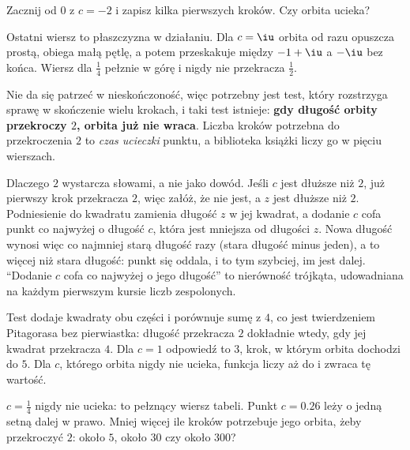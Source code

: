 \begin{think}
Zacznij od $0$ z $c = -2$ i zapisz kilka pierwszych kroków. Czy orbita
ucieka?
\end{think}



\noindent
Ostatni wiersz to płaszczyzna w działaniu. Dla $c = \iu$ orbita od razu
opuszcza prostą, obiega małą pętlę, a potem przeskakuje między $-1 + \iu$ a
$-\iu$ bez końca. Wiersz dla $\tfrac14$ pełznie w górę i nigdy nie
przekracza $\tfrac12$.

Nie da się patrzeć w nieskończoność, więc potrzebny jest test, który
rozstrzyga sprawę w skończenie wielu krokach, i taki test istnieje:
\textbf{gdy długość orbity przekroczy $2$, orbita już nie wraca}. Liczba
kroków potrzebna do przekroczenia $2$ to \emph{czas ucieczki} punktu, a
biblioteka książki liczy go w pięciu wierszach.

\begin{rigourbox}
Dlaczego $2$ wystarcza \dash{} słowami, a nie jako dowód. Jeśli $c$ jest
dłuższe niż $2$, już pierwszy krok przekracza $2$, więc załóż, że nie jest,
a $z$ jest dłuższe niż $2$. Podniesienie do kwadratu zamienia długość $z$ w
jej kwadrat, a dodanie $c$ cofa punkt co najwyżej o długość $c$, która jest
mniejsza od długości $z$. Nowa długość wynosi więc co najmniej starą
długość razy (stara długość minus jeden), a to więcej niż stara długość:
punkt się oddala, i to tym szybciej, im jest dalej. \enquote{Dodanie $c$
cofa co najwyżej o jego długość} to nierówność trójkąta, udowadniana na
każdym pierwszym kursie liczb zespolonych.
\end{rigourbox}


\noindent
Test dodaje kwadraty obu części i porównuje sumę z $4$, co jest
twierdzeniem Pitagorasa bez pierwiastka: długość przekracza $2$ dokładnie
wtedy, gdy jej kwadrat przekracza $4$. Dla $c = 1$ odpowiedź to $3$, krok, w
którym orbita dochodzi do $5$. Dla $c$, którego orbita nigdy nie ucieka,
funkcja liczy aż do  i zwraca tę wartość.

\begin{think}
$c = \tfrac14$ nigdy nie ucieka: to pełznący wiersz tabeli. Punkt
$c = \num{0.26}$ leży o jedną setną dalej w prawo. Mniej więcej ile kroków
potrzebuje jego orbita, żeby przekroczyć $2$: około $5$, około $30$ czy
około $300$?
\end{think}

